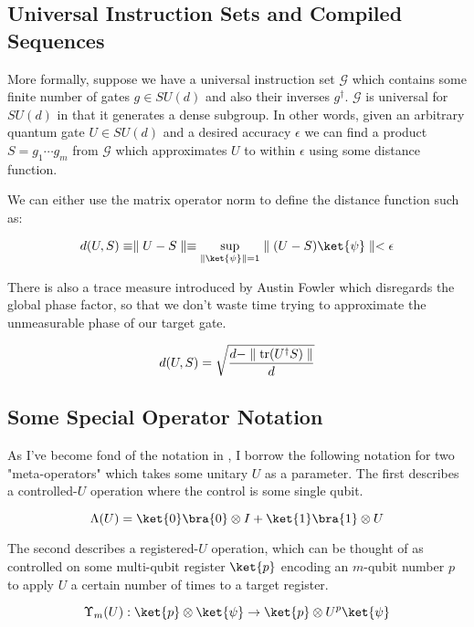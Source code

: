 \subsection{Universal Instruction Sets and Compiled Sequences}
More formally, suppose we have a universal instruction set $\mathcal{G}$ which
contains some finite number of gates $g \in SU(d)$ and also their inverses $g^\dagger$.
$\mathcal{G}$ is universal for $SU(d)$ in that it generates a dense subgroup.
In other words, given an arbitrary quantum gate $U \in SU(d)$ and a desired
accuracy $\epsilon$ we can find a product $S=g_1 \cdots g_m$ from $\mathcal{G}$
which approximates $U$ to within $\epsilon$ using some distance function.

We can either use the matrix operator norm to define the distance function
such as:

\begin{equation}
d(U,S) \equiv \norm{U - S} \equiv \sup_{\norm{\ket{\psi}}=1} \norm{(U-S)\ket{\psi}} < \epsilon
\end{equation}

There is also a trace measure introduced by Austin Fowler which disregards
the global phase factor, so that we don't waste time trying to approximate
the unmeasurable phase of our target gate.

\begin{equation}
d(U,S) = \sqrt{\frac{d - \parallel \mathrm{tr}(U^\dagger S) \parallel}{d}}
\end{equation}

\subsection{Some Special Operator Notation}

As I've become fond of the notation in \cite{ksv02}, I borrow the
following notation for two "meta-operators" which takes some unitary $U$ as
a parameter. The first describes a controlled-$U$ operation where the control
is some single qubit.

\begin{displaymath}
\Lambda(U) = \ket{0}\bra{0} \otimes I + \ket{1}\bra{1} \otimes U
\end{displaymath}

The second describes a registered-$U$ operation, which
can be thought of as controlled on some multi-qubit register $\ket{p}$
encoding an $m$-qubit number $p$ to apply $U$ a certain number of times to a
target
register.

\begin{displaymath}
\Upsilon_m(U) : \ket{p} \otimes \ket{\psi} \rightarrow \ket{p}
\otimes U^p\ket{\psi}
\end{displaymath}
